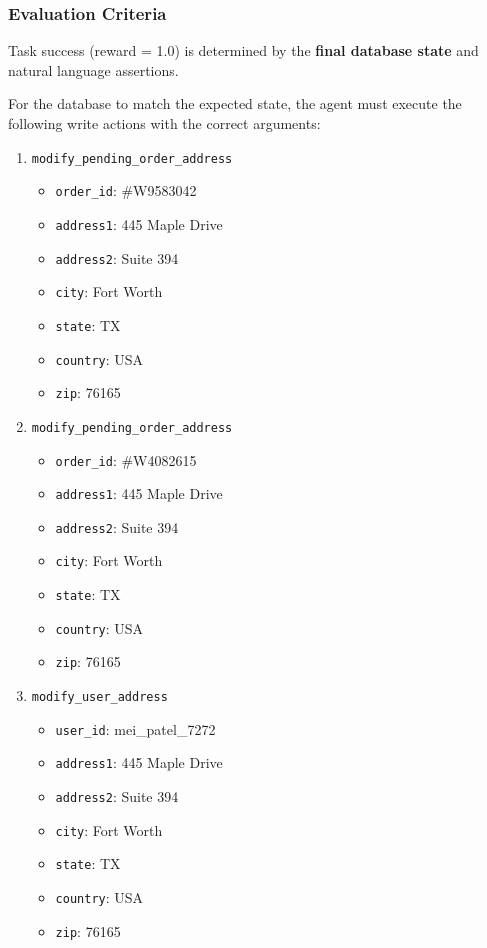 \subsubsection{Evaluation Criteria}

Task success (reward = 1.0) is determined by the \textbf{final database state} and natural language assertions. 

For the database to match the expected state, the agent must execute the following write actions with the correct arguments:

\begin{enumerate}
\item \texttt{modify\_pending\_order\_address}
\begin{itemize}
\item \texttt{order\_id}: \#W9583042
\item \texttt{address1}: 445 Maple Drive
\item \texttt{address2}: Suite 394
\item \texttt{city}: Fort Worth
\item \texttt{state}: TX
\item \texttt{country}: USA
\item \texttt{zip}: 76165
\end{itemize}

\item \texttt{modify\_pending\_order\_address}
\begin{itemize}
\item \texttt{order\_id}: \#W4082615
\item \texttt{address1}: 445 Maple Drive
\item \texttt{address2}: Suite 394
\item \texttt{city}: Fort Worth
\item \texttt{state}: TX
\item \texttt{country}: USA
\item \texttt{zip}: 76165
\end{itemize}

\item \texttt{modify\_user\_address}
\begin{itemize}
\item \texttt{user\_id}: mei\_patel\_7272
\item \texttt{address1}: 445 Maple Drive
\item \texttt{address2}: Suite 394
\item \texttt{city}: Fort Worth
\item \texttt{state}: TX
\item \texttt{country}: USA
\item \texttt{zip}: 76165
\end{itemize}


\end{enumerate}
